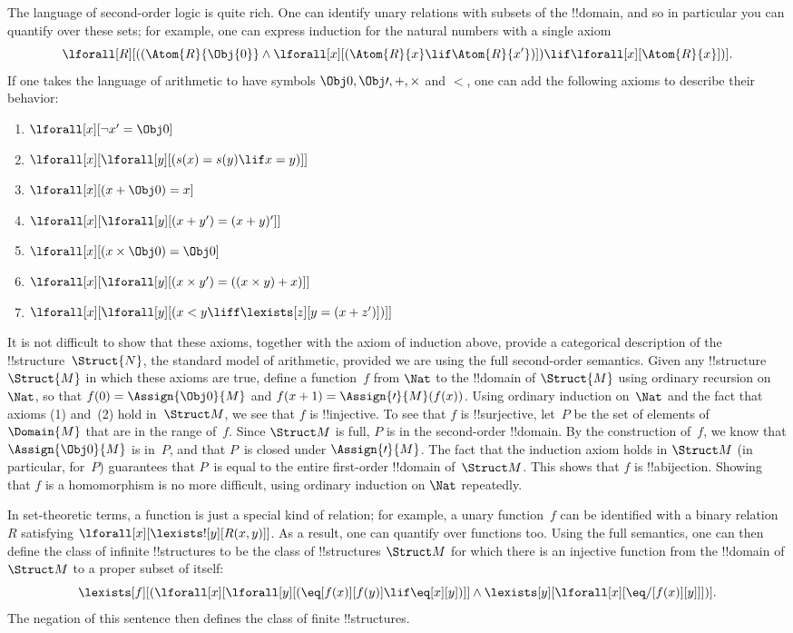 \documentclass[../../../include/open-logic-section]{subfiles}
\begin{document}
The language of second-order logic is quite rich. One can identify
unary relations with subsets of the !!{domain}, and so in particular you
can quantify over these sets; for example, one can express induction
for the natural numbers with a single axiom
\[
\lforall[R][((\Atom{R}{\Obj{0}} \land \lforall[x][(\Atom{R}{x} \lif
    \Atom{R}{x'})]) \lif \lforall[x][\Atom{R}{x}])].
\]
If one takes the language of arithmetic to have symbols $\Obj 0, \Obj \prime, +,
\times$ and $<$, one can add the following axioms to describe their
behavior:
\begin{enumerate}
\item $\lforall[x][\lnot x' = \Obj 0]$
\item $\lforall[x][\lforall[y][(s(x) = s(y) \lif x = y)]]$
\item $\lforall[x][(x + \Obj 0) = x]$
\item $\lforall[x][\lforall[y][(x + y') = (x + y)']]$
\item $\lforall[x][(x \times \Obj 0) = \Obj 0]$
\item $\lforall[x][\lforall[y][(x \times y') = ((x \times y) + x)]]$
\item $\lforall[x][\lforall[y][(x < y \liff \lexists[z][y = (x + z')])]]$
\end{enumerate}
It is not difficult to show that these axioms, together with the axiom
of induction above, provide a categorical description of the
!!{structure}~$\Struct{N}$, the standard model of arithmetic, provided
we are using the full second-order semantics. Given any
!!{structure}~$\Struct{M}$ in which these axioms are true, define a
function~$f$ from $\Nat$ to the !!{domain} of $\Struct{M}$ using
ordinary recursion on $\Nat$, so that $f(0) = \Assign{\Obj 0}{M}$ and
$f(x+1) = \Assign{\prime}{M}(f(x))$. Using ordinary induction
on~$\Nat$ and the fact that axioms (1) and~(2) hold in~$\Struct M$, we
see that $f$ is !!{injective}. To see that $f$ is !!{surjective},
let~$P$ be the set of elements of~$\Domain{M}$ that are in the range
of~$f$. Since $\Struct M$ is full, $P$ is in the second-order
!!{domain}. By the construction of~$f$, we know that $\Assign{\Obj
  0}{M}$ is in~$P$, and that $P$~is closed under
$\Assign{\prime}{M}$. The fact that the induction axiom holds in
$\Struct M$ (in particular, for~$P$) guarantees that $P$~is equal to
the entire first-order !!{domain} of~$\Struct M$. This shows that $f$
is !!a{bijection}. Showing that $f$ is a homomorphism is no more
difficult, using ordinary induction on $\Nat$ repeatedly.

In set-theoretic terms, a function is just a special kind of relation;
for example, a unary function~$f$ can be identified with a binary
relation~$R$ satisfying $\lforall[x][\lexists![y][R(x,y)]]$. As a result, one
can quantify over functions too. Using the full semantics, one can
then define the class of infinite !!{structure}s to be the class of
!!{structure}s $\Struct M$ for which there is an injective function from the
!!{domain} of $\Struct M$ to a proper subset of itself:
\[
\lexists[f][(\lforall[x][\lforall[y][(\eq[f(x)][f(y)] \lif \eq[x][y])]]
  \land \lexists[y][\lforall[x][\eq/[f(x)][y]]])].
\]
The negation of this sentence then defines the class of finite
!!{structure}s.
\end{document}
